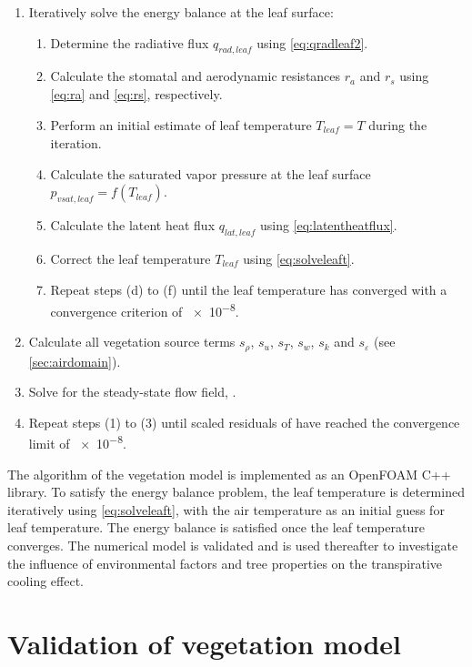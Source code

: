 \begin{enumerate}
\item Iteratively solve the energy balance at the leaf surface:
\begin{enumerate}
	\item Determine the radiative flux $q_{\mathit{rad,leaf}}$ using \cref{eq:qradleaf2}.
	\item Calculate the stomatal and aerodynamic resistances $r_a$ and $r_s$ using \cref{eq:ra} and \cref{eq:rs}, respectively.
	\item Perform an initial estimate of leaf temperature $T_{\mathit{leaf}}=T$ during the iteration.
	\item Calculate the saturated vapor pressure at the leaf surface $p_{\mathit{vsat,leaf}}=f(T_{\mathit{leaf}})$.
	\item Calculate the latent heat flux $q_{\mathit{lat,leaf}}$ using \cref{eq:latentheatflux}. 
	\item Correct the leaf temperature $T_{\mathit{leaf}}$ using \cref{eq:solveleaft}.
	\item Repeat steps (d) to (f) until the leaf temperature has converged with a convergence criterion of \num{e-8}.
\end{enumerate}
\item Calculate all vegetation source terms $s_\rho$, $s_u$, $s_T$, $s_w$, $s_k$ and $s_{\varepsilon}$ (see \cref{sec:airdomain}).
\item Solve for the steady-state flow field, .
\item Repeat steps (1) to (3) until scaled residuals of  have reached the convergence limit of \num{e-8}.
\end{enumerate}

The algorithm of the vegetation model is implemented as an OpenFOAM C++ library. To satisfy the energy balance problem, the leaf temperature is determined iteratively using \cref{eq:solveleaft}, with the air temperature as an initial guess for leaf temperature. The energy balance is satisfied once the leaf temperature converges. The numerical model is validated and is used thereafter to investigate the influence of environmental factors and tree properties on the transpirative cooling effect.

\section{Validation of vegetation model}

